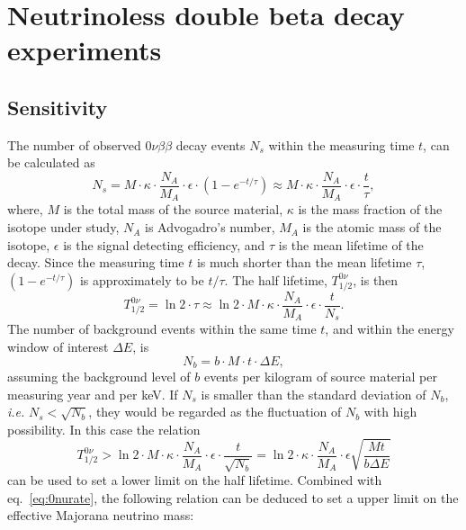 \section{Neutrinoless double beta decay experiments}
\label{sec:gerda:nonubb}

\subsection{Sensitivity}
\label{sec:gerda:sensi}
The number of observed $0\nu\beta\beta$ decay events $N_{s}$ within the measuring time $t$, can be calculated as
\begin{equation}
  \label{eq:gerda:ns}
  N_{s} = M \cdot \kappa \cdot \frac{N_{A}}{M_{A}} \cdot \epsilon \cdot (1 - e^{-t/\tau}) \approx M \cdot \kappa \cdot \frac{N_{A}}{M_{A}} \cdot \epsilon \cdot \frac{t}{\tau},
\end{equation}
where, $M$ is the total mass of the source material, $\kappa$ is the mass fraction of the isotope under study, $N_{A}$ is Advogadro's number, $M_{A}$ is the atomic mass of the isotope, $\epsilon$ is the signal detecting efficiency, and $\tau$ is the mean lifetime of the decay. Since the measuring time $t$ is much shorter than the mean lifetime $\tau$, $(1 - e^{-t/\tau})$ is approximately to be $t/\tau$. The half lifetime, $T^{0\nu}_{1/2}$, is then
\begin{equation}
  \label{eq:gerda:thalf}
  T^{0\nu}_{1/2} = \ln2 \cdot \tau \approx \ln2 \cdot M \cdot \kappa \cdot \frac{N_{A}}{M_{A}} \cdot \epsilon \cdot \frac{t}{N_{s}}.
\end{equation}
The number of background events within the same time $t$, and within the energy window of interest $\Delta E$, is 
\begin{equation}
  \label{eq:gerda:nb}
  N_{b} = b \cdot M \cdot t \cdot \Delta E,
\end{equation}
assuming the background level of $b$ events per kilogram of source material per measuring year and per keV. If $N_{s}$ is smaller than the standard deviation of $N_{b}$, \textit{i.e.} $N_{s}<\sqrt{N_{b}}$, they would be regarded as the fluctuation of $N_{b}$ with high possibility. In this case the relation
\begin{equation}
  \label{eq:gerda:thalfb}
  T^{0\nu}_{1/2} > \ln2 \cdot M \cdot \kappa \cdot \frac{N_{A}}{M_{A}} \cdot \epsilon \cdot \frac{t}{\sqrt{N_{b}}} = \ln2 \cdot \kappa \cdot \frac{N_{A}}{M_{A}} \cdot \epsilon \sqrt{\frac{M t}{b \Delta E}}
\end{equation}
can be used to set a lower limit on the half lifetime. Combined with eq.~\ref{eq:0nurate}, the following relation can be deduced to set a upper limit on the effective Majorana neutrino mass:
